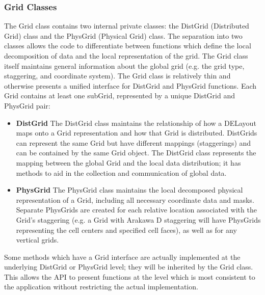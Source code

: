 



\subsubsection{Grid Classes}
The Grid class contains two internal private classes: the DistGrid (Distributed
Grid) class and the PhysGrid (Physical Grid) class.  The separation into two
classes allows the code to differentiate between functions which define the
local decomposition of data and the local representation of the grid.  The Grid
class itself maintains general information about the global grid (e.g. the
grid type, staggering, and coordinate system).  The Grid class is relatively
thin and otherwise presents a unified interface for DistGrid and PhysGrid
functions.  Each Grid contains at least one subGrid, represented by a unique
DistGrid and PhysGrid pair:
\begin{itemize}
\item {\bf DistGrid} The DistGrid class maintains the relationship of how
a DELayout maps onto a Grid representation and how that Grid is distributed.
DistGrids can represent the same Grid but have different mappings (staggerings)
and can be contained by the same Grid object. The DistGrid class represents the
mapping between the global Grid and the local data distribution;  it has
methods to aid in the collection and communication of global data.
\item {\bf PhysGrid} The PhysGrid class maintains the local decomposed physical
representation of a Grid, including all necessary coordinate data and masks.
Separate PhysGrids are created for each relative location associated with the
Grid's staggering (e.g. a Grid with Arakawa D staggering will have PhysGrids
representing the cell centers and specified cell faces), as well as for any
vertical grids.
\end{itemize}

Some methods which have a Grid interface are actually implemented
at the underlying DistGrid or PhysGrid level; they will be inherited
by the Grid class.  This allows the API to present functions at the 
level which is most consistent to the application without restricting
the actual implementation.

